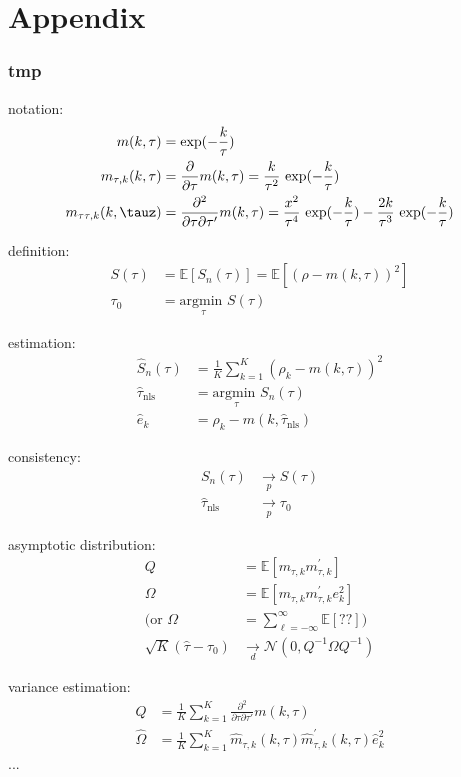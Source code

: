 \documentclass[latex/main.tex]{subfiles}
\begin{document}
\section{Appendix}

\subsubsection{tmp}

notation:
\begin{align*}
    m(k, \tau) &= \text{exp}(-\frac{k}{\tau})\\
    m_{\tau,k}(k, \tau) &= \frac{\partial}{\partial \tau} m(k, \tau) = \frac{k}{\tau^2} \text{ exp}(-\frac{k}{\tau})\\
     m_{\tau\tau,k}(k, \tauz) &= \frac{\partial^2}{\partial \tau \partial \tau'} m(k, \tau) = \frac{x^2}{\tau^4} \text{ exp}(-\frac{k}{\tau}) - \frac{2k}{\tau^3} \text{ exp}(-\frac{k}{\tau})
\end{align*}

definition:
\begin{align*}
    S(\tau) &= \mathbb{E}[S_n(\tau)] = \mathbb{E}[(\rho - m(k, \tau))^2]\\
    \tau_0 &= \underset{\tau}{\text{argmin }} S(\tau)
\end{align*}

estimation:
\begin{align*}
    \hat{S}_n(\tau) &= \frac{1}{K} \sum_{k=1}^K (\rho_k - m(k, \tau))^2\\
    \hat \tau_{\text{nls}} &= \underset{\tau}{\text{argmin }} S_n(\tau)\\
    \hat e_k &= \rho_k - m(k, \hat \tau_{\text{nls}})
\end{align*}

consistency: 
\begin{align*}
    S_n(\tau) &\underset{p}{\to} S(\tau)\\
    \hat \tau_{\text{nls}} &\underset{p}{\to} \tau_0
\end{align*}

asymptotic distribution:
\begin{align*}
    Q &= \mathbb{E}[m_{\tau,k} m_{\tau, k}^{'}]\\
    \Omega &= \mathbb{E}[m_{\tau,k} m_{\tau, k}^{'} e_k^2]\\
    (\text{or } \Omega &= \sum_{\ell=-\infty}^{\infty} \mathbb{E}[??])\\
    \sqrt{K}(\hat\tau - \tau_0) &\underset{d}{\to} \mathcal{N}(0, Q^{-1} \Omega Q^{-1})
\end{align*}

variance estimation:
\begin{align*}
    \hat Q &= \frac{1}{K} \sum_{k=1}^K \frac{\partial^2}{\partial \tau \partial \tau'} m(k, \tau)\\
    \hat \Omega &= \frac{1}{K} \sum_{k=1}^{K} \hat m_{\tau,k}(k, \tau) \hat m_{\tau,k}^{'}(k, \tau) \hat e_k^2
\end{align*}
...
\end{document}
